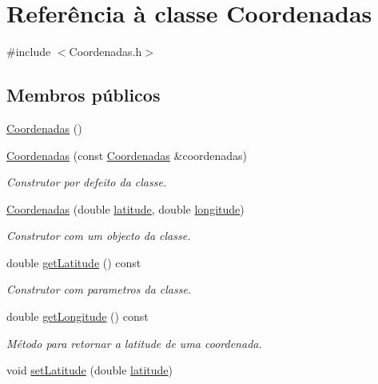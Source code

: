\hypertarget{class_coordenadas}{\section{Referência à classe Coordenadas}
\label{class_coordenadas}
}


{\ttfamily \#include $<$Coordenadas.\+h$>$}

\subsection*{Membros públicos}
\begin{DoxyCompactItemize}
\item 
\hyperlink{class_coordenadas_a1c58a9c0153e6955da84b0861a925c68}{Coordenadas} ()
\item 
\hyperlink{class_coordenadas_a020d5ed69cf70031b77ec5bc3bcb62cb}{Coordenadas} (const \hyperlink{class_coordenadas}{Coordenadas} \&coordenadas)
\begin{DoxyCompactList}\small\item\em Construtor por defeito da classe. \end{DoxyCompactList}\item 
\hyperlink{class_coordenadas_a48d1210d6636eadb64690a2a75686658}{Coordenadas} (double \hyperlink{class_coordenadas_ad7aa0271fc0ca8c8da179f9cfe859bf0}{latitude}, double \hyperlink{class_coordenadas_a328c0d572b3a7d47bfbd866f5d6d6489}{longitude})
\begin{DoxyCompactList}\small\item\em Construtor com um objecto da classe. \end{DoxyCompactList}\item 
double \hyperlink{class_coordenadas_a1eac916230125776b081b09bf5121c8e}{get\+Latitude} () const 
\begin{DoxyCompactList}\small\item\em Construtor com parametros da classe. \end{DoxyCompactList}\item 
double \hyperlink{class_coordenadas_ae2f616716136f0651d389e4824092c55}{get\+Longitude} () const 
\begin{DoxyCompactList}\small\item\em Método para retornar a latitude de uma coordenada. \end{DoxyCompactList}\item 
void \hyperlink{class_coordenadas_a035cce119d74a61cb24676ef76f0f518}{set\+Latitude} (double \hyperlink{class_coordenadas_ad7aa0271fc0ca8c8da179f9cfe859bf0}{latitude})

\end{DoxyCompactItemize}
